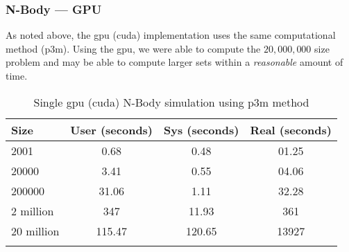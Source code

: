 \subsubsection{N-Body --- GPU}

As noted above, the \gls{gpu} (\gls{cuda}) implementation uses the same
computational method (\gls{p3m}). Using the \gls{gpu}, we were able to compute
the $ 20,000,000 $ size problem and may be able to compute larger sets within a
\emph{reasonable} amount of time.

\begin{table}[htb]
\centering{}
\begin{tabular}{lccc}
\toprule{}
\textbf{Size} & \textbf{User (seconds)} &
\textbf{Sys (seconds)} & \textbf{Real (seconds)} \\
\midrule{}
2001          & 0.68    & 0.48    & 01.25 \\
\midrule{}
20000         & 3.41    & 0.55    & 04.06 \\
\midrule{}
200000        & 31.06   & 1.11    & 32.28 \\
\midrule{}
2 million     & 347     & 11.93   & 361   \\
\midrule{}
20 million    & 115.47  & 120.65  & 13927 \\
\bottomrule{}
\end{tabular}
\caption{Single \gls{gpu} (\gls{cuda}) N-Body simulation using \gls{p3m}
method}
\label{tab:gpu_nbody}
\end{table}
